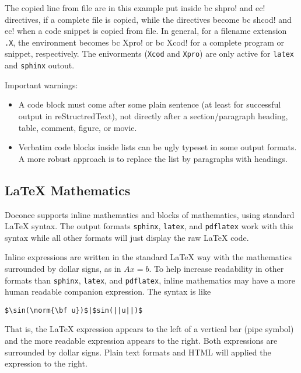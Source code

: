 \documentclass[twoside]{article}
\begin{document}
The copied line from file are in this example put inside {\fontsize{10pt}{10pt}\verb!!bc shpro!}
and {\fontsize{10pt}{10pt}\verb!!ec!} directives, if a complete file is copied, while the
directives become {\fontsize{10pt}{10pt}\verb!!bc shcod!} and {\fontsize{10pt}{10pt}\verb!!ec!} when a code snippet is copied
from file. In general, for a filename extension {\fontsize{10pt}{10pt}\verb!.X!}, the environment
becomes {\fontsize{10pt}{10pt}\verb!!bc Xpro!} or {\fontsize{10pt}{10pt}\verb!!bc Xcod!} for a complete program or snippet,
respectively. The enivorments ({\fontsize{10pt}{10pt}\verb!Xcod!} and {\fontsize{10pt}{10pt}\verb!Xpro!}) are only active
for {\fontsize{10pt}{10pt}\verb!latex!} and {\fontsize{10pt}{10pt}\verb!sphinx!} outout.

Important warnings:

\begin{itemize}
 \item A code block must come after some plain sentence (at least for successful
   output in reStructredText), not directly after a section/paragraph heading,
   table, comment, figure, or movie.

 \item Verbatim code blocks inside lists can be ugly typeset in some
   output formats. A more robust approach is to replace the list by
   paragraphs with headings.
\end{itemize}

\noindent

\subsection{{\LaTeX} Mathematics}

Doconce supports inline mathematics and blocks of mathematics, using
standard {\LaTeX} syntax. The output formats {\fontsize{10pt}{10pt}\verb!sphinx!}, {\fontsize{10pt}{10pt}\verb!latex!}, and {\fontsize{10pt}{10pt}\verb!pdflatex!}
work with this syntax while all other formats will just display the
raw {\LaTeX} code.

Inline expressions are written in the standard
{\LaTeX} way with the mathematics surrounded by dollar signs, as in
$Ax=b$. To help increase readability in other formats than {\fontsize{10pt}{10pt}\verb!sphinx!},
{\fontsize{10pt}{10pt}\verb!latex!}, and {\fontsize{10pt}{10pt}\verb!pdflatex!}, inline mathematics may have a more human
readable companion expression. The syntax is like
\begin{Verbatim}
$\sin(\norm{\bf u})$|$sin(||u||)$
\end{Verbatim}
That is, the {\LaTeX} expression appears to the left of a vertical bar (pipe
symbol) and the more readable expression appears to the right. Both
expressions are surrounded by dollar signs. Plain text formats and HTML
will applied the expression to the right.
\end{document}
